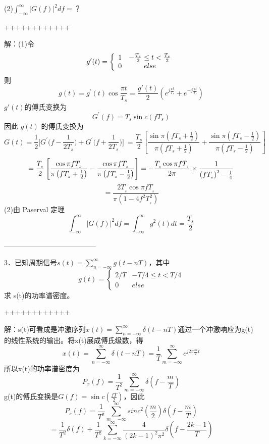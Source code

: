 \documentclass[utf8]{article}
\begin{document}
(2)$\int_{-\infty}^{\infty}\left|G\left(f\right)\right|^{2}d f=$？

++++++++++++

解：(1)令
$$
g^{\prime}(t)=\left\{\begin{array}{c c}{{1}}&{{-\frac{T_{s}}{2}\leq t< \frac{T_{s}}{2}}}\\{{0}}&{{e l s e}}\end{array}\right.
$$
则
$$g\left(t\right)=g^{\prime}\left(t\right)\cos\frac{\pi t}{T_{s}}=\frac{g'(t)}{2} \left(e^{j\frac{\pi t}{T_{s}}}+e^{-j\frac{\pi t}{T_{s}}} \right)
$$
$g′(t)$的傅氏变换为 $$G^{\prime}\left(f\right)=T_{s}\sin c (f T_{s})$$
因此 $g(t)$ 的傅氏变换为 
$$G(t)=\frac{1}{2}\Bigg[G^{\prime}\Bigg(f-\frac{1}{2T_{s}}\Bigg)+G^{\prime}\Bigg(f+\frac{1}{2T_{s}}\Bigg)\Bigg]\ = \frac{T_{s}}{2} \left[ \frac{ \sin \pi \left( fT_{s}+ \frac{1}{2} \right)}{ \pi \left( fT_{s}+ \frac{1}{2} \right)}+ \frac{ \sin \pi \left( fT_{s}- \frac{1}{2} \right)}{ \pi \left( fT_{s}- \frac{1}{2} \right)} \right]$$
$$
=\frac{T_{{}_{ s}}}{2} \left[\frac{\cos\pi f T_{{}_{ s}}}{\pi\left(f T_{{}_{ s}} + \frac{1}{2}\right)} - \frac{\cos\pi f T_{ {}_{ s}}}{\pi\left(f T_{{}_{ s}} - \frac{1}{2}\right)} \right] = - \frac{T_{{}_{ s}}\cos\pi f T_{{}_{ s}}}{2\pi} \times \frac{1}{\left(f T_{ {}_{ s}}\right)^{ 2}- \frac{1}{4}}\\ 
$$
$$
= \frac{2T_{{}_{ s}}\cos\pi f T_{{}_{ s}}}{\pi\left( 1 - 4f^{ 2}T_{{}_{ s}}^{ 2}\right)}
$$
(2)由 Paserval 定理
$$\int_{- \infty}^{ \infty} \left| G \left( f \right) \right|^{2}df= \int_{- \infty}^{ \infty}g^{2} \left( t \right) dt= \frac{T_{s}}{2}$$

---------------------------------------

3．已知周期信号$s \left( t \right)= \sum_{n=- \infty}^{ \infty}g \left( t-nT \right)$，其中$$g \left( t \right)= \left \{ \begin{matrix} 2 \big/T&-T \big/4 \leq t<T \big/4 \\ 0&else \end{matrix} \right.$$
求 s(t)的功率谱密度。

++++++++++++

解：s(t)可看成是冲激序列$x \left( t \right)= \sum_{n=- \infty}^{ \infty} \delta \left( t-nT \right)$通过一个冲激响应为g(t)的线性系统的输出。将x(t)展成傅氏级数，得
$$x \left( t \right)= \sum_{n=- \infty}^{ \infty} \delta \left( t-nT \right)= \frac{1}{T} \sum_{m=- \infty}^{ \infty}e^{j2 \pi \frac{m}{T}t}$$
所以x(t)的功率谱密度为
$$P_{x} \left( f \right)= \frac{1}{T^{2}} \sum_{m=- \infty}^{ \infty} \delta \left( f- \frac{m}{T} \right)$$
g(t)的傅氏变换是$G \left( f \right)= \sin{c} \left( \frac{fT}{2} \right)$，因此
$$P_{s} \left( f \right)= \frac{1}{T^{2}} \sum_{m=- \infty}^{ \infty} sinc^{2} \left( \frac{m}{2} \right) \delta \left( f- \frac{m}{T} \right)$$
$$= \frac{1}{T^{2}} \delta \left( f \right)+ \frac{1}{T^{2}} \sum_{k=- \infty}^{ \infty} \frac{4}{ \left( 2k-1 \right)^{2} \pi^{2}} \delta \left( f- \frac{2k-1}{T} \right)$$
\end{document}
